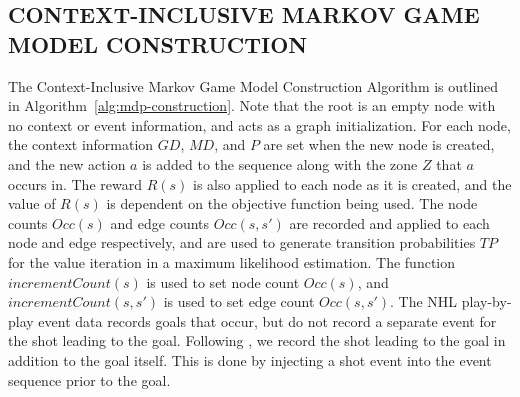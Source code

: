 \documentclass[]{article}
\begin{document}
\subsection{CONTEXT-INCLUSIVE MARKOV GAME MODEL CONSTRUCTION}
\label{subsec:mdp-construction}

The Context-Inclusive Markov Game Model Construction Algorithm is outlined in Algorithm~\ref{alg:mdp-construction}. Note that the root is an empty node with no context or event information, and acts as a graph initialization. For each node, the context information $GD$, $MD$, and $P$ are set when the new node is created, and the new action $a$ is added to the sequence along with the zone $Z$ that $a$ occurs in. The reward $R(s)$ is also applied to each node as it is created, and the value of $R(s)$ is dependent on the objective function being used.  The node counts $Occ(s)$ and edge counts $Occ(s,s')$ are recorded and applied to each node and edge respectively, and are used to generate transition probabilities $TP$ for the value iteration in a maximum likelihood estimation. The function $incrementCount(s)$ is used to set node count $Occ(s)$, and $incrementCount(s,s')$ is used to set edge count $Occ(s,s')$. The NHL play-by-play event data records goals that occur, but do not record a separate event for the shot leading to the goal. Following \citep{Schuckers2013}, we record the shot leading to the goal in addition to the goal itself. This is done by injecting a shot event into the event sequence prior to the goal. %
\end{document}
